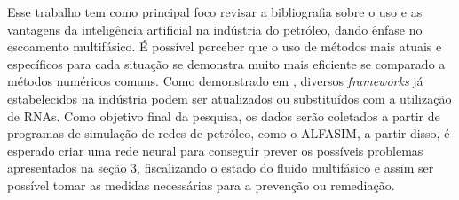 \documentclass{article}[12pt, openright, oneside, a4paper, portuguese]
\begin{document}
    Esse trabalho tem como principal foco revisar a bibliografia sobre o uso e as vantagens da inteligência artificial na indústria do petróleo, dando ênfase no escoamento multifásico. É possível perceber que o uso de métodos mais atuais e específicos para cada situação se demonstra muito mais eficiente se comparado a métodos numéricos comuns. Como demonstrado em , diversos \textit{frameworks} já estabelecidos na indústria podem ser atualizados ou substituídos com a utilização de RNAs. Como objetivo final da pesquisa, os dados serão coletados a partir de programas de simulação de redes de petróleo, como o ALFASIM, a partir disso, é esperado criar uma rede neural para conseguir prever os possíveis problemas apresentados na seção 3, fiscalizando o estado do fluido multifásico e assim ser possível tomar as medidas necessárias para a prevenção ou remediação.

\def\refname{Referências Bibliográficas}


\end{document}
